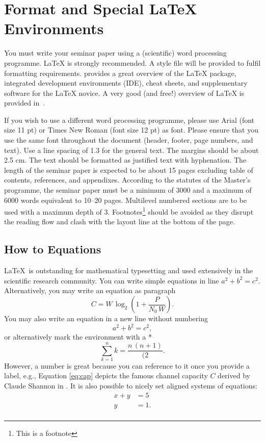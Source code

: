 \section{Format and Special \LaTeX{} Environments} 

You must write your seminar paper using a (scientific) word processing programme. \LaTeX{} is
strongly recommended. A style file will be provided to fulfil formatting requirements.
\cite{TUG} provides a great overview of the \LaTeX{} package, integrated development environments
(IDE), cheat sheets, and supplementary software for the \LaTeX{} novice. A very good (and free!)
overview of \LaTeX{} is provided in~\cite{Oet23}. 

If you wish to use a different word processing programme, please use Arial (font size 11 pt) or
Times New Roman (font size 12 pt) as font. Please ensure that you use the same font throughout the
document (header, footer, page numbers, and text). Use a line spacing of 1.3 for the general text.
The margins should be about 2.5 cm. The text should be formatted as justified text with hyphenation.
The length of the seminar paper is expected to be about 15 pages excluding table of contents,
references, and appendixes. According to the statutes of the Master's programme, the seminar paper
must be a minimum of 3000 and a maximum of 6000 words equivalent to 10--20 pages. Multilevel
numbered sections are to be used with a maximum depth of 3. Footnotes\footnote{This is a footnote}
should be avoided as they disrupt the reading flow and clash with the layout line at the bottom of
the page.

\subsection{How to Equations} %
\LaTeX~is outstanding for mathematical typesetting and used extensively in the scientific research
community. You can write simple equations in line ${a^2 + b^2 = c^2}$. Alternatively, you may write
an equation as paragraph
\begin{equation}
    C = W \, \log_2 \left( 1 + \frac{P}{N_0 \, W} \right).
    \label{eq:cap}
\end{equation}
You may also write an equation in a new line without numbering
\[ a^2 + b^2 = c^2, \]
or alternatively mark the environment with a *
\begin{equation*}
    \sum_{k=1}^n k = \frac{n\,(n+1)}{(2}.
\end{equation*}
However, a number is great because you can reference to it once you provide a label, e.g., Equation
\eqref{eq:cap} depicts the famous channel capacity $C$ derived by Claude Shannon in \cite{Sha48}. It
is also possible to nicely set aligned systems of equations:
\begin{align}
    x + y & = 5 \\
    y & = 1. \\
\end{align}

